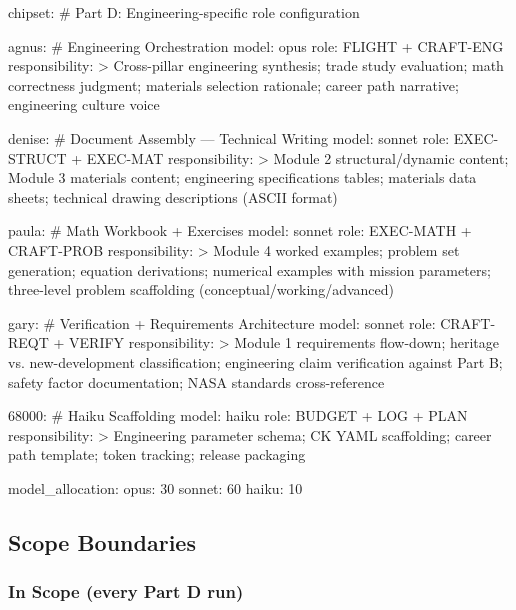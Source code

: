 \documentclass[11pt,letterpaper]{article}
\begin{document}
\begin{asciibox}
chipset:
  # Part D: Engineering-specific role configuration

  agnus:              # Engineering Orchestration
    model: opus
    role: FLIGHT + CRAFT-ENG
    responsibility: >
      Cross-pillar engineering synthesis; trade study evaluation;
      math correctness judgment; materials selection rationale;
      career path narrative; engineering culture voice

  denise:             # Document Assembly — Technical Writing
    model: sonnet
    role: EXEC-STRUCT + EXEC-MAT
    responsibility: >
      Module 2 structural/dynamic content; Module 3 materials content;
      engineering specifications tables; materials data sheets;
      technical drawing descriptions (ASCII format)

  paula:              # Math Workbook + Exercises
    model: sonnet
    role: EXEC-MATH + CRAFT-PROB
    responsibility: >
      Module 4 worked examples; problem set generation;
      equation derivations; numerical examples with mission parameters;
      three-level problem scaffolding (conceptual/working/advanced)

  gary:               # Verification + Requirements Architecture
    model: sonnet
    role: CRAFT-REQT + VERIFY
    responsibility: >
      Module 1 requirements flow-down; heritage vs. new-development
      classification; engineering claim verification against Part B;
      safety factor documentation; NASA standards cross-reference

  68000:              # Haiku Scaffolding
    model: haiku
    role: BUDGET + LOG + PLAN
    responsibility: >
      Engineering parameter schema; CK YAML scaffolding;
      career path template; token tracking; release packaging

model_allocation:
  opus: 30%
  sonnet: 60%
  haiku: 10%
\end{asciibox}

\subsection{Scope Boundaries}

\subsubsection{In Scope (every Part D run)}
\end{document}
